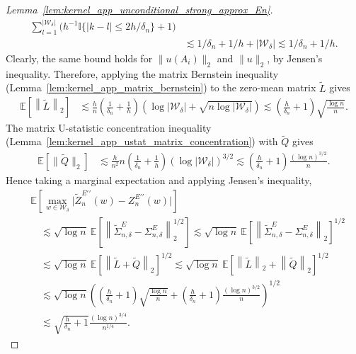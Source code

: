 \documentclass[11pt,lof]{puthesis}
\newcommand{\E}{\ensuremath{\mathbb{E}}}
\newcommand{\I}{\ensuremath{\mathbb{I}}}
\newcommand{\cW}{\ensuremath{\mathcal{W}}}
\newcommand{\dprime}{\ensuremath{\prime\prime}}
\theoremstyle{break}
\theoremstyle{proof}
\newtheorem{proof}{Proof}
\begin{document}
\begin{proof}[Lemma~\ref{lem:kernel_app_unconditional_strong_approx_En}]
\begin{align*}
    \sum_{l=1}^{|\cW_\delta|}
    \Big(
      h^{-1}
      \I\big\{ |k-l| \leq 2h/\delta_n \big\}
      + 1
    \Big) \\
    &\lesssim
    1/\delta_n
    + 1/h
    + |\cW_\delta|
    \lesssim
    1/\delta_n
    + 1/h.
  \end{align*}
  Clearly, the same bound holds for
  $\|u(A_i)\|_2$ and $\|u\|_2$, by Jensen's inequality.
  Therefore, applying the matrix Bernstein inequality
  (Lemma~\ref{lem:kernel_app_matrix_bernstein})
  to the zero-mean matrix $\tilde L$ gives
  \begin{align*}
    \E\left[
      \left\|
      \tilde L
      \right\|_2
    \right]
    &\lesssim
    \frac{h}{n}
    \left(\frac{1}{\delta_n} + \frac{1}{h} \right)
    \left(
      \log |\cW_\delta| + \sqrt{n \log |\cW_\delta|}
    \right)
    \lesssim
    \left(\frac{h}{\delta_n} + 1 \right)
    \sqrt{\frac{\log n}{n}}.
  \end{align*}
  The matrix U-statistic concentration inequality
  (Lemma~\ref{lem:kernel_app_ustat_matrix_concentration})
  with $\tilde Q$ gives
  \begin{align*}
    \E\left[
      \big\|
      \tilde Q
      \big\|_2
    \right]
    &\lesssim
    \frac{h}{n^2}
    n
    \left(\frac{1}{\delta_n} + \frac{1}{h} \right)
    \left(
      \log |\cW_\delta|
    \right)^{3/2}
    \lesssim
    \left(\frac{h}{\delta_n} + 1 \right)
    \frac{(\log n)^{3/2}}{n}.
  \end{align*}
  Hence taking a marginal expectation
  and applying Jensen's inequality,
  \begin{align*}
    &\E\left[
      \max_{w \in \cW_\delta}
      \big|\tilde Z_n^{E\dprime}(w) - Z_n^{E\dprime}(w)\big|
    \right] \\
    &\quad\lesssim
    \sqrt{\log n} \
    \E\left[
      \left\|
      \tilde\Sigma^E_{n,\delta} - \Sigma^E_{n,\delta}
      \right\|_2^{1/2}
    \right]
    \lesssim
    \sqrt{\log n} \
    \E\left[
      \left\|
      \tilde\Sigma^E_{n,\delta} - \Sigma^E_{n,\delta}
      \right\|_2
    \right]^{1/2} \\
    &\quad\lesssim
    \sqrt{\log n} \
    \E\left[
      \left\|
      \tilde L
      + \tilde Q
      \right\|_2
    \right]^{1/2}
    \lesssim
    \sqrt{\log n} \
    \E\left[
      \left\|
      \tilde L
      \right\|_2
      + \left\|
      \tilde Q
      \right\|_2
    \right]^{1/2} \\
    &\quad\lesssim
    \sqrt{\log n}
    \left(
      \left(\frac{h}{\delta_n} + 1 \right)
      \sqrt{\frac{\log n}{n}}
      + \left(\frac{h}{\delta_n} + 1 \right)
      \frac{(\log n)^{3/2}}{n}
    \right)^{1/2} \\
    &\quad\lesssim
    \sqrt{\frac{h}{\delta_n} + 1}
    \frac{(\log n)^{3/4}}{n^{1/4}}.
  \end{align*}


\end{proof}
\end{document}
